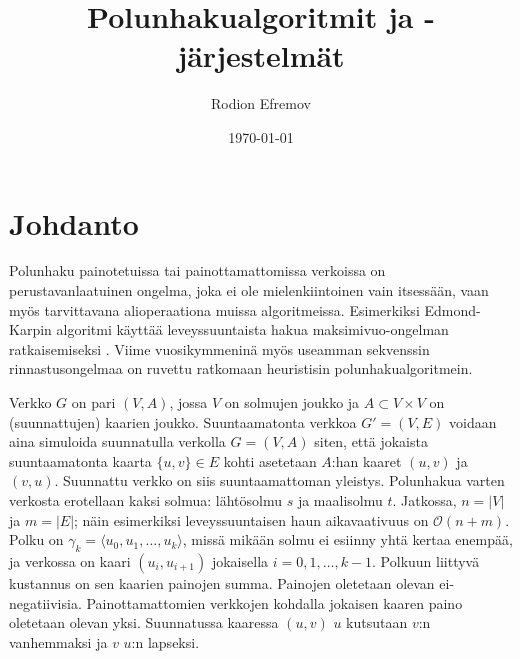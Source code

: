 \documentclass[finnish]{tktltiki2}
\title{Polunhakualgoritmit ja -järjestelmät}
\author{Rodion Efremov}
\date{\today}
\theoremstyle{definition}
\theoremstyle{remark}
\begin{document}

\frontmatter      %

\maketitle        %
\makeabstract     %

\tableofcontents  %


\mainmatter       %

\section{Johdanto}
Polunhaku painotetuissa tai painottamattomissa verkoissa on perustavanlaatuinen ongelma, joka ei ole mielenkiintoinen vain itsessään, vaan myös tarvittavana alioperaationa muissa algoritmeissa. Esimerkiksi Edmond-Karpin algoritmi käyttää leveyssuuntaista hakua maksimivuo-ongelman ratkaisemiseksi \cite{Cormen09}. Viime vuosikymmeninä myös useamman sekvenssin rinnastusongelmaa on ruvettu ratkomaan heuristisin polunhakualgoritmein.

Verkko $G$ on pari $(V, A)$, jossa $V$ on solmujen joukko ja $A \subset V \times V$ on (suunnattujen) kaarien joukko. Suuntaamatonta verkkoa $G' = (V, E)$ voidaan aina simuloida suunnatulla verkolla $G= (V, A)$ siten, että jokaista suuntaamatonta kaarta $\{ u, v \} \in E$ kohti asetetaan $A$:han kaaret $(u, v)$ ja $(v, u)$. Suunnattu verkko on siis suuntaamattoman yleistys. Polunhakua varten verkosta erotellaan kaksi solmua: lähtösolmu $s$ ja maalisolmu $t$. Jatkossa, $n = |V|$ ja $m = |E|$; näin esimerkiksi leveyssuuntaisen haun aikavaativuus on $\mathcal{O}(n + m)$. Polku on $\gamma_k = \langle u_0, u_1, \dots, u_k \rangle$, missä mikään solmu ei esiinny yhtä kertaa enempää, ja verkossa on kaari $(u_i, u_{i + 1})$ jokaisella $i = 0, 1, \dots, k - 1$. Polkuun liittyvä kustannus on sen kaarien painojen summa. Painojen oletetaan olevan ei-negatiivisia. Painottamattomien verkkojen kohdalla jokaisen kaaren paino oletetaan olevan yksi.  Suunnatussa kaaressa $(u, v)$ $u$ kutsutaan $v$:n vanhemmaksi ja $v$ $u$:n lapseksi.

%
%
% 
%
\end{document}
